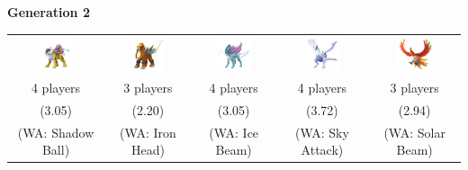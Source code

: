 \documentclass[8pt,aspectratio=169,compress]{beamer}
\begin{document}
\begin{frame}
\begin{tiny}
\begin{block}{}
\textbf{Generation 2}
\begin{center}
\begin{tabular}{ccccc}
\includegraphics[width=1cm]{../../images/pokemon/Raikou} & 
\includegraphics[width=1cm]{../../images/pokemon/Entei} & 
\includegraphics[width=1cm]{../../images/pokemon/Suicune} & 
\includegraphics[width=1cm]{../../images/pokemon/Lugia} & 
\includegraphics[width=1cm]{../../images/pokemon/Ho-oh} \\
4 players & 3 players & 4 players & 4 players & 3 players \\
(3.05) & (2.20) & (3.05) & (3.72) & (2.94) \\
(WA: Shadow Ball) &  (WA: Iron Head) & (WA: Ice Beam) &  (WA: Sky Attack) &  (WA: Solar Beam) \\
\end{tabular}
\end{center}
\end{block}

\end{tiny}
\end{frame}
\end{document}
